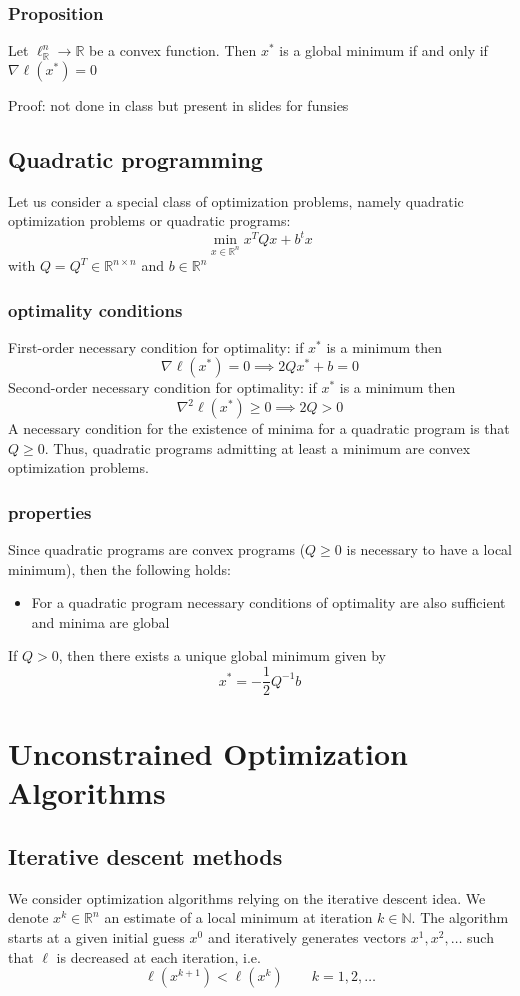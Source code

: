 \documentclass{book}
\newcommand{\R}{\mathbb{R}}
\newcommand{\N}{\mathbb{N}}
\begin{document}
\subsubsection{Proposition}
Let $\ell_\R^n \to \R$ be a convex function. Then $x^*$ is a global minimum if and only if $\nabla\ell(x^*)=0$

Proof: not done in class but present in slides for funsies

\subsection{Quadratic programming}
Let us consider a special class of optimization problems, namely quadratic optimization problems or quadratic programs: 
\[
    \min_{x\in\R^n}x^TQx+b^tx
\]
with $Q=Q^T\in\R^{n\times n}$ and $b\in\R^n$
\subsubsection{optimality conditions}
First-order necessary condition for optimality: if $x^*$ is a minimum then 
\[
    \nabla \ell(x^*)=0 \implies 2Qx^*+b=0
\]
Second-order necessary condition for optimality: if $x^*$ is a minimum then 
\[
    \nabla^2\ell(x^*)\geq 0 \implies 2Q>0
\]
A necessary condition for the existence of minima for a quadratic program is that $Q\geq 0$. Thus, quadratic programs admitting at least a minimum are convex optimization problems.
\subsubsection{properties}
Since quadratic programs are convex programs ($Q\geq 0$ is necessary to have a local minimum), then the following holds: 
\begin{itemize}
    \item For a quadratic program necessary conditions of optimality are also sufficient and minima are global
\end{itemize}
If $Q>0$, then there exists a unique global minimum given by 
\[
    x^* = -\displaystyle\frac{1}{2}Q^{-1}b
\]

\section{Unconstrained Optimization Algorithms}
\subsection{Iterative descent methods}
We consider optimization algorithms relying on the iterative descent idea. We denote $x^k\in\R^n$ an estimate of a local minimum at iteration $k\in\N$. The algorithm starts at a given initial guess $x^0$ and iteratively generates vectors $x^1,x^2,\dots$ such that $\ell$ is decreased at each iteration, i.e. 
\[
    \ell(x^{k+1})<\ell(x^k) \qquad k = 1,2,\dots
\]
\end{document}
